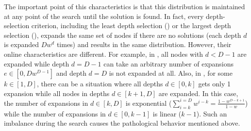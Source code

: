 The important point of this characteristics is that this distribution is maintained at any point of the search
until the solution is found. In fact, every depth-selection criterion, including the least depth selection (\fifo) or
the largest depth selection (\lifo), expands the same set of nodes if there are no solutions (each depth
$d$ is expanded $Dw^d$ times) and results in the same distribution.
However, their online characteristics are different.
For example, in \fifo, all nodes with $d<D-1$ are expanded while depth $d=D-1$ can take an arbitrary number of expansions $e \in [0, Dw^{D-1}]$ and depth $d=D$ is not expanded at all.
Also, in \lifo, for some $k\in [1,D]$, there can be a situation where all depths $d \in [0,k]$ gets only 1 expansion
while all nodes in depths $d \in [k+1,D]$ are expanded. In this case, the number of expansions in $d \in [k,D]$ is exponential ($\sum_{i=k}^{i=D}w^{i-k}=\frac{1-w^{D-k+1}}{1-w}$) while the number of expansions in $d \in [0,k-1]$ is linear ($k-1$). Such an imbalance during the search causes the pathological behavior mentioned above.


